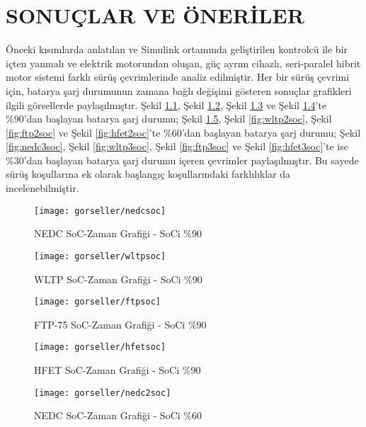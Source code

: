 \chapter{SONUÇLAR VE ÖNERİLER}
\label{sonuclarveoneriler}

Önceki kısımlarda anlatılan ve Simulink ortamında geliştirilen kontrolcü ile bir içten yanmalı ve elektrik motorundan oluşan,
güç ayrım cihazlı, seri-paralel hibrit motor sistemi farklı sürüş çevrimlerinde analiz edilmiştir. Her bir sürüş çevrimi için, batarya şarj durumunun zamana bağlı değişimi gösteren
sonuçlar grafikleri ilgili görsellerde paylaşılmıştır. Şekil \ref{fig:nedcsoc}, Şekil \ref{fig:wltpsoc}, Şekil \ref{fig:ftpsoc} ve Şekil \ref{fig:hfetsoc}'te \%90'dan başlayan batarya şarj durumu;
Şekil \ref{fig:nedc2soc}, Şekil \ref{fig:wltp2soc}, Şekil \ref{fig:ftp2soc} ve Şekil \ref{fig:hfet2soc}'te \%60'dan başlayan batarya şarj durumu;
Şekil \ref{fig:nedc3soc}, Şekil \ref{fig:wltp3soc}, Şekil \ref{fig:ftp3soc} ve Şekil \ref{fig:hfet3soc}'te ise \%30'dan başlayan batarya şarj durumu
içeren çevrimler paylaşılmıştır. Bu sayede sürüş koşullarına ek olarak başlangıç koşullarındaki farklılıklar da incelenebilmiştir.

\begin{figure}[h]
    \centering
    \texttt{[image: gorseller/nedcsoc]}
    \caption{NEDC SoC-Zaman Grafiği - SoCi \%90}\label{fig:nedcsoc}
\end{figure}

\begin{figure}[h]
    \centering
    \texttt{[image: gorseller/wltpsoc]}
    \caption{WLTP SoC-Zaman Grafiği - SoCi \%90}\label{fig:wltpsoc}
\end{figure}

\begin{figure}[h]
    \centering
    \texttt{[image: gorseller/ftpsoc]}
    \caption{FTP-75 SoC-Zaman Grafiği - SoCi \%90}\label{fig:ftpsoc}
\end{figure}

\begin{figure}[h]
    \centering
    \texttt{[image: gorseller/hfetsoc]}
    \caption{HFET SoC-Zaman Grafiği - SoCi \%90}\label{fig:hfetsoc}
\end{figure}
%
\begin{figure}[h]
    \centering
    \texttt{[image: gorseller/nedc2soc]}
    \caption{NEDC SoC-Zaman Grafiği - SoCi \%60}\label{fig:nedc2soc}
\end{figure}

